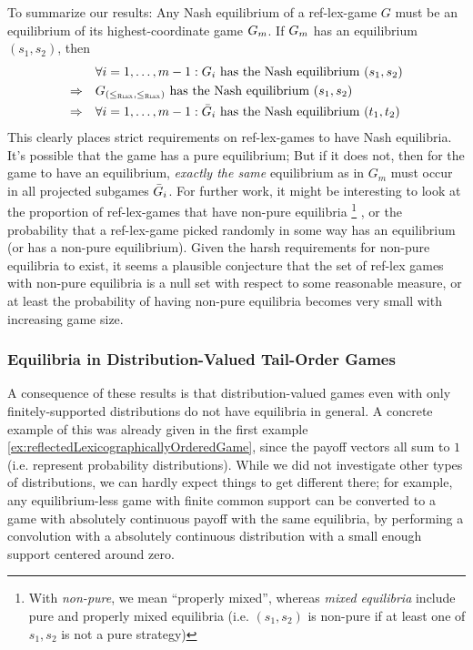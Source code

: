 \documentclass[a4paper]{scrreprt}
\begin{document}
    To summarize our results: Any Nash equilibrium of a ref-lex-game $G$ must be an equilibrium of its highest-coordinate game $G_{m}$.
    If $G_{m}$ has an equilibrium $(s_1, s_2)$, then
    \begin{align*}
         &\forall i = 1, \dots, m-1: G_{i} \text{ has the Nash equilibrium } (s_1, s_2) \\
         \Rightarrow\quad &G_{(\leq_{\textsc{Rlex}},\leq_{\textsc{Rlex}})} \text{ has the Nash equilibrium } (s_1, s_2) \\
         \Rightarrow\quad &\forall i = 1, \dots, m-1: \bar{G}_{i} \text{ has the Nash equilibrium } (t_1, t_2) 
    \end{align*}
    This clearly places strict requirements on ref-lex-games to have Nash equilibria. It's possible that the game has a pure equilibrium;
    But if it does not, then for the game to have an equilibrium, \emph{exactly the same} equilibrium as in $G_m$ must occur in all projected subgames $\bar{G}_{i}$.
    For further work, it might be interesting to look at the proportion of ref-lex-games that have non-pure equilibria
    \footnote{With \emph{non-pure}, we mean “properly mixed”, whereas \emph{mixed equilibria} include pure and properly mixed equilibria (i.e. $(s_1, s_2)$ is non-pure if at least one of $s_1, s_2$ is not a pure strategy)}
    , or the probability that a ref-lex-game picked randomly in some way has an equilibrium (or has a non-pure equilibrium). Given the harsh requirements for non-pure equilibria to exist, it seems a plausible conjecture that the set of ref-lex games with non-pure equilibria is a null set with respect to some reasonable measure, or at least the probability of having non-pure equilibria becomes very small with increasing game size.
    
    \subsubsection{Equilibria in Distribution-Valued Tail-Order Games}
    A consequence of these results is that distribution-valued games even with only finitely-supported distributions do not have equilibria in general.
    A concrete example of this was already given in the first example \ref{ex:reflectedLexicographicallyOrderedGame}, since the payoff vectors all sum to $1$ (i.e. represent probability distributions).
    While we did not investigate other types of distributions, we can hardly expect things to get different there; for example, any equilibrium-less game with finite common support can be converted to a game with absolutely continuous payoff with the same equilibria, by performing a convolution with a absolutely continuous distribution with a small enough support centered around zero.
    
\end{document}
